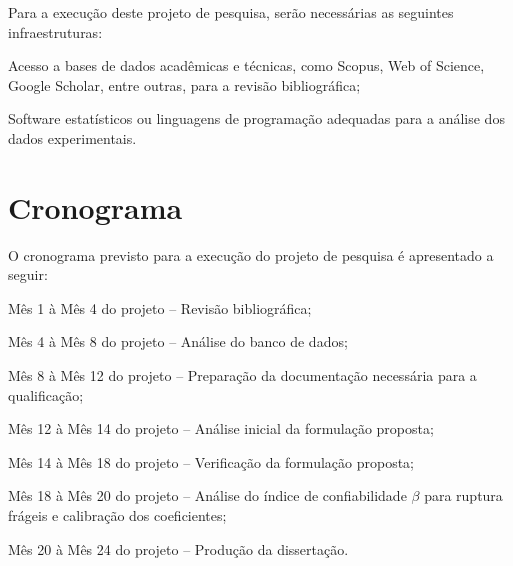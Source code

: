 Para a execução deste projeto de pesquisa, serão necessárias as seguintes infraestruturas:
\begin{alineas}
	\item Acesso a bases de dados acadêmicas e técnicas, como Scopus, Web of Science, Google Scholar, entre outras, para a revisão bibliográfica;
	\item Software estatísticos ou linguagens de programação adequadas para a análise dos dados experimentais.
\end{alineas}


\chapter{Cronograma}

O cronograma previsto para a execução do projeto de pesquisa é apresentado a seguir:

\begin{alineas}
    \item Mês 1 à Mês 4 do projeto -- Revisão bibliográfica;
    \item Mês 4 à Mês 8 do projeto -- Análise do banco de dados;
    \item Mês 8 à Mês 12 do projeto -- Preparação da documentação necessária para a qualificação;
    \item Mês 12 à Mês 14 do projeto -- Análise inicial da formulação proposta;
    \item Mês 14 à Mês 18 do projeto -- Verificação da formulação proposta;
    \item Mês 18 à Mês 20 do projeto -- Análise do índice de confiabilidade $\beta$ para ruptura frágeis e calibração dos coeficientes;
    \item Mês 20 à Mês 24 do projeto -- Produção da dissertação.
\end{alineas}

